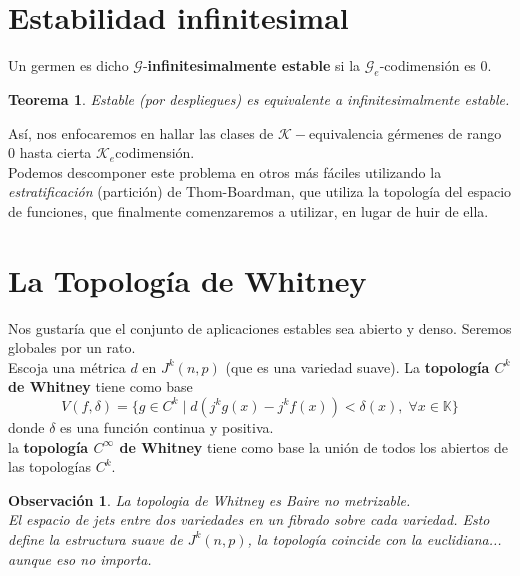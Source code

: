 \documentclass[12pt]{book}
\newtheorem{teo}{Teorema}
\newtheorem{obs}{Observación}
\newcommand{\kg}{\mathcal{K}}
\begin{document}
\section{Estabilidad infinitesimal}
Un germen es dicho $\mathcal{G}$-\textbf{infinitesimalmente estable} si la $\mathcal{G}_e$-codimensión es  $0$.
\begin{teo}
Estable (por despliegues) es equivalente a infinitesimalmente estable.
\end{teo}








Así, nos enfocaremos en hallar las clases de $\kg-$equivalencia gérmenes de rango $0$ hasta cierta $\kg_e $codimensión.\\

Podemos descomponer este problema en otros más fáciles utilizando la \textit{estratificación} (partición) de Thom-Boardman, que utiliza la topología del espacio de funciones, que finalmente comenzaremos a utilizar, en lugar de huir de ella.




\section{La Topología de Whitney}

Nos gustaría que el conjunto de aplicaciones estables sea abierto y denso. Seremos globales por un rato.\\

Escoja una métrica $d$ en $J^k(n,p)$ (que es una variedad suave). La \textbf{topología $C^k$ de Whitney} tiene como base $$ V(f, \delta) = \{ g\in C^k \; |\; d (j^k g (x) - j^k f(x) ) < \delta (x), \; \forall x\in \mathbb{K} \} $$
donde $\delta$ es una función continua y positiva.\\
la \textbf{topología $C^\infty$ de Whitney} tiene como base la unión de todos los abiertos de las topologías $C^k$.

\begin{obs}
	La topologia de Whitney es Baire no metrizable.\\
	El espacio de jets entre dos variedades en un fibrado sobre cada variedad. Esto define la estructura suave de $J^k(n,p)$, la topología coincide con la euclidiana... aunque eso no importa.
\end{obs}
\end{document}
